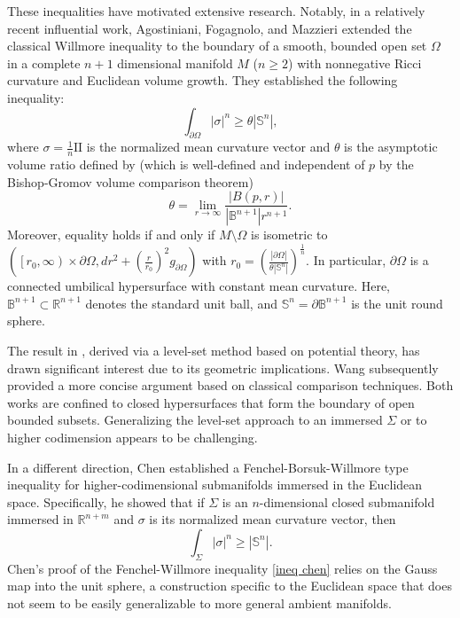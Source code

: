 \documentclass[11pt, reqno]{amsart}
\numberwithin{equation}{section}
\begin{document}
These inequalities have motivated extensive research. Notably, in a relatively recent influential work, Agostiniani, Fogagnolo, and Mazzieri \cite{Agostiniani-Fogagnolo-Mazzieri} extended the classical Willmore inequality to the boundary of a smooth, bounded open set $\Omega$ in a complete $n+1$ dimensional manifold $M$ ($n\ge 2$) with nonnegative Ricci curvature and Euclidean volume growth. They established the following inequality:
\begin{equation*}
\int_{\partial \Omega}\left|\sigma\right|^{n} \ge \theta\left|\mathbb{S}^{n}\right|,
\end{equation*}
where $\sigma=\frac{1}{n}\mathrm{II}$ is the normalized mean curvature vector and $\theta$ is the asymptotic volume ratio defined by (which is well-defined and independent of $p$ by the Bishop-Gromov volume comparison theorem)
$$\theta=\lim_{r \rightarrow \infty} \frac{ |B(p, r)|}{|\mathbb{B}^{n+1}|r^{n+1}}. $$
Moreover, equality holds if and only if $M \setminus \Omega$ is isometric to $\left(\left[r_0, \infty\right) \times \partial \Omega, d r^2+\left(\frac{r}{r_0}\right)^2 g_{\partial \Omega}\right)$ with $r_0=\left(\frac{|\partial \Omega|}{\theta\left|\mathbb{S}^n\right|}\right)^{\frac{1}{n}}$.
In particular, $\partial \Omega$ is a connected umbilical hypersurface with constant mean curvature.
Here, $\mathbb{B}^{n+1} \subset \mathbb{R}^{n+1}$ denotes the standard unit ball, and $\mathbb{S}^{n} = \partial \mathbb{B}^{n+1}$ is the unit round sphere.

The result in \cite{Agostiniani-Fogagnolo-Mazzieri}, derived via a level-set method based on potential theory, has drawn significant interest due to its geometric implications. Wang \cite{Wang23} subsequently provided a more concise argument based on classical comparison techniques. Both works are confined to closed hypersurfaces that form the boundary of open bounded subsets. Generalizing the level-set approach to an immersed $\Sigma$ or to higher codimension appears to be challenging.

In a different direction, Chen \cite{Chen1971} established a Fenchel-Borsuk-Willmore type inequality for higher-codimensional submanifolds immersed in the Euclidean space. Specifically, he showed that if $\Sigma$ is an $n$-dimensional closed submanifold immersed in $\mathbb{R}^{n+m}$ and $\sigma$ is its normalized mean curvature vector, then
\begin{equation}\label{ineq chen}
\int_{\Sigma}|\sigma|^n \ge \left|\mathbb{S}^n\right|.
\end{equation}
Chen's proof of the Fenchel-Willmore inequality \eqref{ineq chen} relies on the Gauss map into the unit sphere, a construction specific to the Euclidean space that does not seem to be easily generalizable to more general ambient manifolds.
\end{document}
